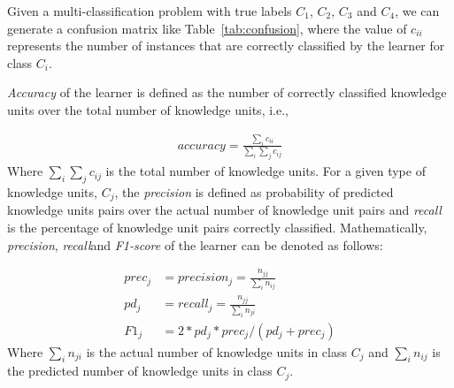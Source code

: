 \documentclass[sigconf,review, anonymous]{acmart}
\theoremstyle{break}
\newcommand{\tab}[1]{Table~\ref{tab:#1}}
\begin{document}
\begin{table}[htp]
\caption {Confusion Matrix.}
\scriptsize
{}

\label{tab:confusion}
\end{table}

Given a multi-classification problem with true labels $C_1$, 
$C_2$, $C_3$ and $C_4$, we can generate a confusion matrix like \tab{confusion}, 
where the value of $c_{ii}$ represents the number of instances that are correctly classified
by the learner for class $C_i$. 

{\it Accuracy} of the learner is defined as the number of  correctly
classified knowledge units over the total number of knowledge units, i.e.,


{\[
\begin{array}{ll}
accuracy = \frac{\sum_i c_{ii}}{\sum_{i}\sum_{j}c_{ij}}
\end{array}
\]}
Where ${\sum_{i}\sum_{j}c_{ij}}$ is the total number of knowledge units.
For a given type of knowledge units, $C_j$, the {\it precision} is defined as probability of
predicted knowledge units pairs over the actual number of knowledge unit pairs and
 {\it recall} is the percentage of knowledge unit pairs correctly classified. Mathematically,
  {\it precision}, {\it recall}and {\it F1-score} of 
the learner can be denoted as follows:

{\[
\begin{array}{ll}
prec_j &= precision_j = \frac{n_{jj}}{\sum_{i}n_{ij}}\\
pd_j &= recall_j = \frac{n_{jj}}{\sum_{i}n_{ji}}\\ 
F1_{j} &= 2*pd_j*prec_j/(pd_j + prec_j)
\end{array}
\]}
Where ${\sum_{i}n_{ji}}$ is the actual number of knowledge units in class $C_j$
and $\sum_{i}n_{ij}$ is the predicted number of knowledge units in class $C_j$.
\end{document}
